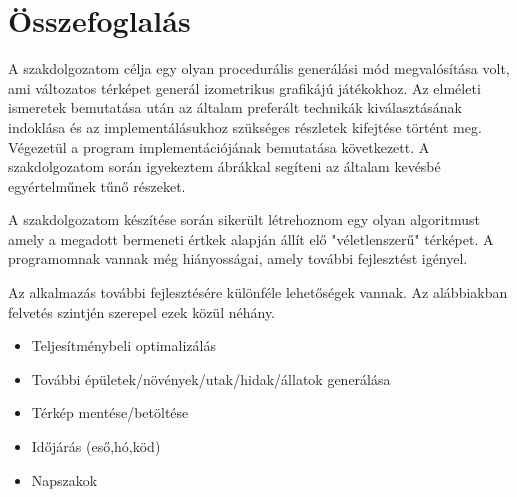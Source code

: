 \chapter{Összefoglalás}

A szakdolgozatom célja egy olyan procedurális generálási mód megvalósítása volt, ami változatos térképet generál izometrikus grafikájú játékokhoz. Az elméleti ismeretek bemutatása után az általam preferált technikák kiválasztásának indoklása és az implementálásukhoz szükséges részletek kifejtése történt meg. Végezetül a program implementációjának bemutatása következett. A szakdolgozatom során igyekeztem ábrákkal segíteni az általam kevésbé egyértelműnek tűnő részeket. 

\bigskip

\noindent A szakdolgozatom készítése során sikerült létrehoznom egy olyan algoritmust amely a megadott bermeneti értkek alapján állít elő "véletlenszerű" térképet. A programomnak vannak még hiányosságai, amely további fejlesztést igényel.

\bigskip

\noindent Az alkalmazás további fejlesztésére különféle lehetőségek vannak. Az alábbiakban felvetés szintjén szerepel ezek közül néhány.
\begin{itemize}
\item Teljesítménybeli optimalizálás
\item További épületek/növények/utak/hidak/állatok generálása
\item Térkép mentése/betöltése
\item Időjárás (eső,hó,köd)
\item Napszakok
\end{itemize}
